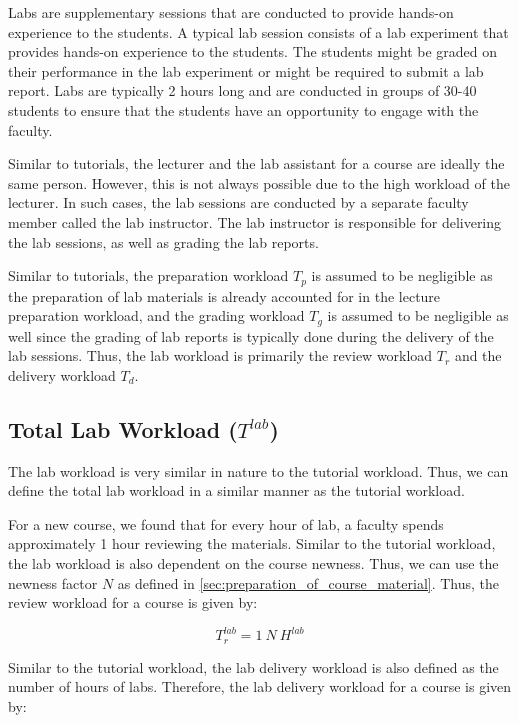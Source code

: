 Labs are supplementary sessions that are conducted to provide hands-on experience to the students. A typical lab session consists of a lab experiment that provides hands-on experience to the students. The students might be graded on their performance in the lab experiment or might be required to submit a lab report. Labs are typically 2 hours long and are conducted in groups of 30-40 students to ensure that the students have an opportunity to engage with the faculty.

Similar to tutorials, the lecturer and the lab assistant for a course are ideally the same person. However, this is not always possible due to the high workload of the lecturer. In such cases, the lab sessions are conducted by a separate faculty member called the lab instructor. The lab instructor is responsible for delivering the lab sessions, as well as grading the lab reports.

Similar to tutorials, the preparation workload \(T_p\) is assumed to be negligible as the preparation of lab materials is already accounted for in the lecture preparation workload, and the grading workload \(T_g\) is assumed to be negligible as well since the grading of lab reports is typically done during the delivery of the lab sessions. Thus, the lab workload is primarily the review workload \(T_r\) and the delivery workload \(T_d\).

\subsection{Total Lab Workload (\texorpdfstring{\(T^{lab}\)}{})}

The lab workload is very similar in nature to the tutorial workload. Thus, we can define the total lab workload in a similar manner as the tutorial workload.

For a new course, we found that for every hour of lab, a faculty spends approximately 1 hour reviewing the materials. Similar to the tutorial workload, the lab workload is also dependent on the course newness. Thus, we can use the newness factor \(N\) as defined in \autoref{sec:preparation_of_course_material}. Thus, the review workload for a course is given by:

\begin{equation}
  \label{eqn:lab-review-workload}
  T_r^{lab} = 1\ N \ H^{lab}
\end{equation}

Similar to the tutorial workload, the lab delivery workload is also defined as the number of hours of labs. Therefore, the lab delivery workload for a course is given by:

